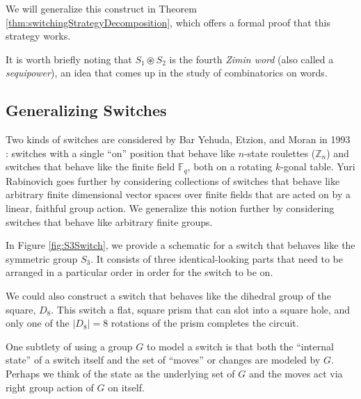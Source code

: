 We will generalize this construct in
Theorem \ref{thm:switchingStrategyDecomposition},
which offers a formal proof that this strategy works.

It is worth briefly noting that $S_1 \circledast S_2$ is the fourth
\textit{Zimin word} (also called a \textit{sequipower}),
an idea that comes up in the study of combinatorics on words.

\subsection{Generalizing Switches}
\label{sec:GeneralizingSwitches}
Two kinds of switches are considered by Bar Yehuda, Etzion, and Moran in 1993
\cite{BarYehuda1993}: switches with a single ``on'' position that behave like
$n$-state roulettes ($\mathbb Z_n$) and switches that behave like
the finite field $\mathbb F_q$, both on a rotating $k$-gonal table.
Yuri Rabinovich \cite{Rabinovich2022} goes further by considering collections
of switches that behave like arbitrary finite dimensional vector spaces over
finite fields that are acted on by a linear, faithful group action.
We generalize this notion further by considering switches that behave like
arbitrary finite groups.

\begin{example}
In Figure \ref{fig:S3Switch}, we provide a schematic for a switch that behaves
like the symmetric group $S_3$.
It consists of three identical-looking parts that need to be
arranged in a particular order in order for the switch to be on.

We could also construct a switch that behaves like the dihedral group of the
square, $D_8$. This switch a flat, square prism that can slot into a square hole,
and only one of the $|D_8| = 8$ rotations of the prism completes the circuit.
\end{example}



One subtlety of using a group $G$ to model a switch is that
both the ``internal state'' of a switch itself and
the set of ``moves'' or changes are modeled by $G$.
Perhaps we think of the state as the underlying set of $G$
and the moves act via right group action of $G$ on itself.


